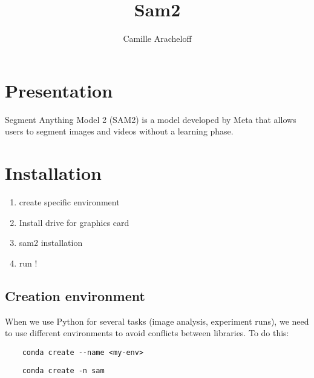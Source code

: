\documentclass{article}
\title{Sam2}
\author{Camille Aracheloff}
\begin{document}
\maketitle


\section{Presentation}

Segment Anything Model 2 (SAM2)\cite{ravi2024sam} is a model developed by Meta that allows users to segment images and videos without a learning phase.\newline


\section{Installation}





\begin{enumerate}
    \item create specific environment 
    
    \item Install drive for graphics card
    
    
    \item sam2 installation
    
    \item run !
\end{enumerate}


\subsection{Creation environment}


When we use Python for several tasks (image analysis, experiment runs), we need to use different environments to avoid conflicts between libraries. To do this: \newline


\begin{lstlisting}
    conda create --name <my-env>
\end{lstlisting}


\begin{lstlisting}
    conda create -n sam
\end{lstlisting}
\end{document}
